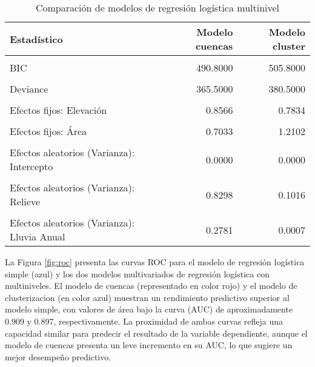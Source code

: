 \documentclass[
  manuscript=article,  
  layout=preprint,  
]{format}
\begin{document}
\begin{table}[!h]
\label{tab:comparacion}
\caption{Comparación de modelos de regresión logística multinivel}
\centering
\begin{tabular}[t]{lrr}
\toprule
Estadístico & Modelo cuencas & Modelo cluster\\
\midrule
\cellcolor{gray!6}{AIC} & \cellcolor{gray!6}{405.5000} & \cellcolor{gray!6}{420.5000}\\
BIC & 490.8000 & 505.8000\\
\cellcolor{gray!6}{Log Verosimilitud} & \cellcolor{gray!6}{-182.7000} & \cellcolor{gray!6}{-190.2000}\\
Deviance & 365.5000 & 380.5000\\
\midrule
\cellcolor{gray!6}{Efectos fijos: Intercepto} & \cellcolor{gray!6}{2.0011} & \cellcolor{gray!6}{2.0580}\\
\addlinespace
Efectos fijos: Elevación & 0.8566 & 0.7834\\
\cellcolor{gray!6}{Efectos fijos: Relieve} & \cellcolor{gray!6}{1.0958} & \cellcolor{gray!6}{1.2863}\\
Efectos fijos: Área & 0.7033 & 1.2102\\
\cellcolor{gray!6}{Efectos fijos: Lluvia Anual} & \cellcolor{gray!6}{-0.3884} & \cellcolor{gray!6}{-0.4966}\\
\midrule
Efectos aleatorios (Varianza): Intercepto & 0.0000 & 0.0000\\
\addlinespace
\cellcolor{gray!6}{Efectos aleatorios (Varianza): Elevación} & \cellcolor{gray!6}{0.0033} & \cellcolor{gray!6}{0.0007}\\
Efectos aleatorios (Varianza): Relieve & 0.8298 & 0.1016\\
\cellcolor{gray!6}{Efectos aleatorios (Varianza): Área} & \cellcolor{gray!6}{0.0075} & \cellcolor{gray!6}{0.3551}\\
Efectos aleatorios (Varianza): Lluvia Anual & 0.2781 & 0.0007\\
\bottomrule
\end{tabular}
\end{table}

La Figura \ref{fig:roc} presenta las curvas ROC para el modelo de regresión logística simple (azul) y los dos modelos multivariados de regresión logística con multiniveles. El modelo de cuencas (representado en color rojo) y el modelo de clusterizacion (en color azul) muestran un rendimiento predictivo superior al modelo simple, con valores de área bajo la curva (AUC) de aproximadamente 0.909 y 0.897, respectivamente. La proximidad de ambas curvas refleja una capacidad similar para predecir el resultado de la variable dependiente, aunque el modelo de cuencas presenta un leve incremento en su AUC, lo que sugiere un mejor desempeño predictivo.
\end{document}
